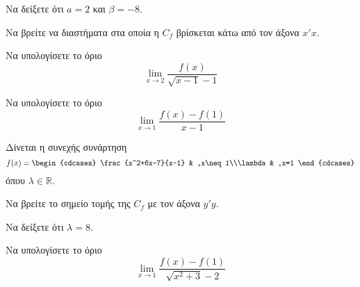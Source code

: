 \documentclass[ektypwsh]{frontisthrio-diag}
\begin{document}
\begin{thema}
\begin{erwthma}
\item Να δείξετε ότι $ a=2 $ και $ \beta=-8 $.
\item Να βρείτε να διαστήματα στα οποία η $ C_f $ βρίσκεται κάτω από τον άξονα $ x'x $.
\item Να υπολογίσετε το όριο
\[ \lim_{x\to 2}\frac{f(x)}{\sqrt{x-1}-1} \]
\item Να υπολογίσετε το όριο
\[ \lim_{x\to 1}\frac{f(x)-f(1)}{x-1} \]
\end{erwthma}
\item Δίνεται η συνεχής συνάρτηση
\[ f(x)=\begin{cdcases}
\frac{x^2+6x-7}{x-1} & ,x\neq 1\\\lambda & ,x=1
\end{cdcases} \]
όπου $ \lambda\in\mathbb{R} $. 
\begin{erwthma}
\item Να βρείτε το σημείο τομής της $ C_f $ με τον άξονα $ y'y $.
\item Να δείξετε ότι $ \lambda=8 $.
\item Να υπολογίσετε το όριο
\[ \lim_{x\to 1}\frac{f(x)-f(1)}{\sqrt{x^2+3}-2} \]
\end{erwthma}
\end{thema}
\end{document}
